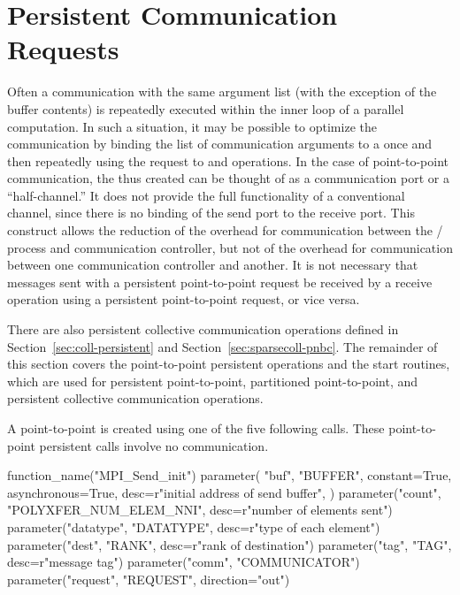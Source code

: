 \section{Persistent Communication Requests}
\label{sec:pt2pt-persistent}

Often a communication with the same argument list (with the exception of the buffer contents) is repeatedly
executed within the inner loop of a parallel computation.  In such a
situation, it may be possible to optimize the communication by
binding the list of communication arguments to a 
once and then repeatedly using
the request to  and  operations. %
In the case of point-to-point communication, the
 thus created can be thought of as a
communication port or a ``half-channel.''
It does not provide the full functionality of a conventional channel,
since there is no binding of the send port to the receive port. This
construct allows the reduction of the overhead for communication
between the \MPI/ process and communication controller, but not of the overhead for
communication between one communication controller and another.
It is not necessary that messages sent with a persistent point-to-point request be received
by a receive operation using a persistent point-to-point request, or vice versa.

There are also persistent collective communication operations defined in
Section~\ref{sec:coll-persistent} and Section~\ref{sec:sparsecoll-pnbc}.
The remainder of this section covers the point-to-point
persistent  operations and the start
routines, which are used for persistent point-to-point, partitioned point-to-point, and
persistent collective communication operations.

A point-to-point  is created using one of the
five
following calls.  These point-to-point persistent  calls involve no communication.

\begin{mpi-binding}
    function_name("MPI_Send_init")
    parameter(
        "buf",
        "BUFFER",
        constant=True,
        asynchronous=True,
        desc=r"initial address of send buffer",
    )
    parameter("count", "POLYXFER_NUM_ELEM_NNI", desc=r"number of elements sent")
    parameter("datatype", "DATATYPE", desc=r"type of each element")
    parameter("dest", "RANK", desc=r"rank of destination")
    parameter("tag", "TAG", desc=r"message tag")
    parameter("comm", "COMMUNICATOR")
    parameter("request", "REQUEST", direction="out")
\end{mpi-binding}

